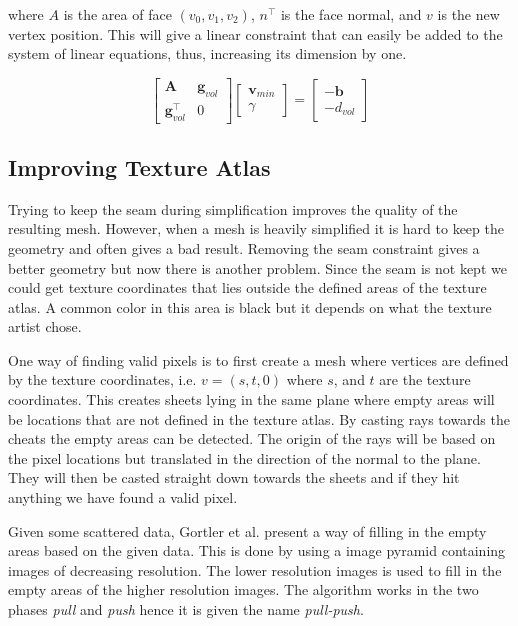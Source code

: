 where $A$ is the area of face $(v_0, v_1, v_2)$, $n^\intercal$ is the face normal, and $v$ is the new vertex position. This will give a linear constraint that can easily be added to the system of linear equations, thus, increasing its dimension by one.

\begin{equation} \label{eq:volume_constraint}
  \begin{bmatrix}
    \mathbf{A}                & \mathbf{g}_{vol} \\
     \mathbf{g}_{vol}^\intercal & 0
  \end{bmatrix}
  \begin{bmatrix}
    \mathbf{v}_{min} \\
    \gamma
  \end{bmatrix}
  =
  \begin{bmatrix}
    -\mathbf{b} \\
    -d_{vol}
  \end{bmatrix}
\end{equation}


\subsection{Improving Texture Atlas}
Trying to keep the seam during simplification improves the quality of the resulting mesh. However, when a mesh is heavily simplified it is hard to keep the geometry and often gives a bad result. Removing the seam constraint gives a better geometry but now there is another problem. Since the seam is not kept we could get texture coordinates that lies outside the defined areas of the texture atlas. A common color in this area is black but it depends on what the texture artist chose.

One way of finding valid pixels is to first create a mesh where vertices are defined by the texture coordinates, i.e. $v = (s, t, 0)$ where $s$, and $t$ are the texture coordinates. This creates sheets lying in the same plane where empty areas will be locations that are not defined in the texture atlas. By casting rays towards the cheats the empty areas can be detected. The origin of the rays will be based on the pixel locations but translated in the direction of the normal to the plane. They will then be casted straight down towards the sheets and if they hit anything we have found a valid pixel.

Given some scattered data, Gortler et al. \cite{Gortler96thelumigraph} present a way of filling in the empty areas based on the given data. This is done by using a image pyramid containing images of decreasing resolution. The lower resolution images is used to fill in the empty areas of the higher resolution images. The algorithm works in the two phases \emph{pull} and \emph{push} hence it is given the name \emph{pull-push}.

